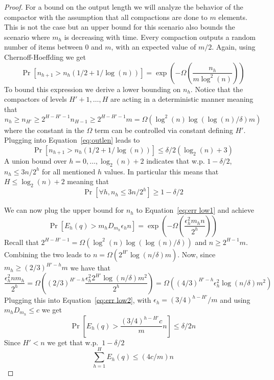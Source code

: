 \documentclass[12pt]{colt2019} %
\newcommand{\eps}{\epsilon}
\begin{document}
{\begin{proof}
For a bound on the output length we will analyze the behavior of the compactor with the assumption that all compactions are done to $m$ elements. This is not the case but an upper bound for this scenario also bounds the scenario where $m_h$ is decreasing with time. Every compaction outputs a random number of items between $0$ and $m$, with an expected value of $m/2$. Again, using Chernoff-Hoeffding we get
\begin{equation} \label{eq:outlen}
\Pr\left[ n_{h+1} > n_h(1/2+1/\log(n)) \right] = \exp \left( -\Omega\left( \frac{n_h}{m \log^2(n)} \right) \right) 
\end{equation}
To bound this expression we derive a lower bounding on $n_h$. Notice that the compactors of levels $H'+1,\ldots,H$ are acting in a deterministic manner meaning that 
$$n_h \geq n_{H'} \geq 2^{H-H'-1}n_{H-1} \geq 2^{H-H'-1}m = \Omega(\log^2(n)\log(\log(n)/\delta)m)$$
where the constant in the $\Omega$ term can be controlled via constant defining $H'$. Plugging into Equation~\eqref{eq:outlen} leads to
\begin{equation*} 
\Pr\left[ n_{h+1} > n_h(1/2+1/\log(n)) \right] \leq \delta/2(\log_2(n)+3)
\end{equation*}
A union bound over $h=0,\ldots,\log_2(n)+2$ indicates that w.p. $1-\delta/2$, $n_h \leq 3n/2^h$ for all mentioned $h$ values. In particular this means that $H \leq \log_2(n)+2$ meaning that 
\begin{equation} \label{eq:outlen2}
\Pr\left[ \forall h, n_h \leq 3n/2^h \right] \geq 1-\delta/2
\end{equation}

We can now plug the upper bound for $n_h$ to Equation~\ref{eq:err low1} and achieve 
\begin{equation} \label{eq:err low2}
\Pr\left[ E_h(q) > m_h D_{m_h} \eps_h n \right] = \exp \left( -\Omega\left( \frac{\eps_h^2 m_h n}{2^h} \right) \right)
\end{equation}
Recall that $2^{H-H'-1} = \Omega(\log^2(n)\log(\log(n)/\delta))$ and $n \geq 2^{H-1}m$. Combining the two leads to $n = \Omega(2^{H'}\log(n/\delta)m)$. Now, since $m_h \geq (2/3)^{H'-h}m$ we have that
$$
\frac{\eps_h^2 n m_h}{2^h} = \Omega\left( (2/3)^{H'-h} \frac{\eps_h^2 2^{H'} \log(n/\delta) m^2}{2^h} \right) = \Omega\left( (4/3)^{H'-h} \eps_h^2 \log(n/\delta) m^2 \right)
$$
Plugging this into Equation~\eqref{eq:err low2}, with $\eps_h = (3/4)^{h-H'}/m$ and using $m_h D_{m_h} \leq c$ we get
\begin{equation} \label{eq:err low3}
\Pr\left[ E_h(q) > \frac{(3/4)^{h-H'} c}{m} n \right]  \leq \delta/2n
\end{equation}
Since $H' < n$ we get that w.p.\ $1-\delta/2$
$$ \sum_{h=1}^H E_h(q) \leq (4c/m) n $$


\end{proof}}
\end{document}
